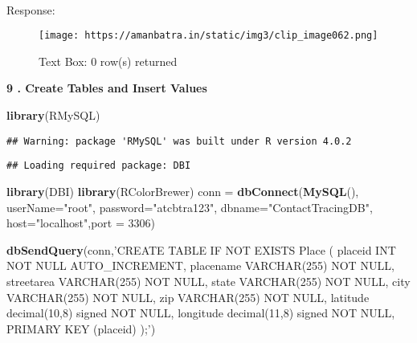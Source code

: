 \documentclass[
]{article}
\newenvironment{Shaded}{\begin{snugshade}}{\end{snugshade}}
\newcommand{\DataTypeTok}[1]{\textcolor[rgb]{0.13,0.29,0.53}{#1}}
\newcommand{\DecValTok}[1]{\textcolor[rgb]{0.00,0.00,0.81}{#1}}
\newcommand{\KeywordTok}[1]{\textcolor[rgb]{0.13,0.29,0.53}{\textbf{#1}}}
\newcommand{\NormalTok}[1]{#1}
\newcommand{\StringTok}[1]{\textcolor[rgb]{0.31,0.60,0.02}{#1}}
\begin{document}
~

Response:

\begin{figure}
\centering
\texttt{[image: https://amanbatra.in/static/img3/clip\_image062.png]}
\caption{Text Box: 0 row(s) returned}
\end{figure}

\textbf{9 . Create Tables and Insert Values}

\begin{Shaded}
\begin{Highlighting}[]
\KeywordTok{library}\NormalTok{(RMySQL)}
\end{Highlighting}
\end{Shaded}

\begin{verbatim}
## Warning: package 'RMySQL' was built under R version 4.0.2
\end{verbatim}

\begin{verbatim}
## Loading required package: DBI
\end{verbatim}

\begin{Shaded}
\begin{Highlighting}[]
\KeywordTok{library}\NormalTok{(DBI)}
\KeywordTok{library}\NormalTok{(RColorBrewer)}
\NormalTok{conn =}\StringTok{ }\KeywordTok{dbConnect}\NormalTok{(}\KeywordTok{MySQL}\NormalTok{(), }\DataTypeTok{userName=}\StringTok{"root"}\NormalTok{, }\DataTypeTok{password=}\StringTok{"atcbtra123"}\NormalTok{, }\DataTypeTok{dbname=}\StringTok{"ContactTracingDB"}\NormalTok{, }\DataTypeTok{host=}\StringTok{"localhost"}\NormalTok{,}\DataTypeTok{port =} \DecValTok{3306}\NormalTok{)}
\end{Highlighting}
\end{Shaded}

\begin{Shaded}
\begin{Highlighting}[]
\KeywordTok{dbSendQuery}\NormalTok{(conn,}\StringTok{'CREATE TABLE IF NOT EXISTS Place (}
\StringTok{  placeid INT NOT NULL AUTO_INCREMENT, }
\StringTok{  placename VARCHAR(255) NOT NULL, }
\StringTok{  streetarea VARCHAR(255) NOT NULL, }
\StringTok{  state VARCHAR(255) NOT NULL, }
\StringTok{  city VARCHAR(255) NOT NULL, }
\StringTok{  zip VARCHAR(255) NOT NULL,}
\StringTok{  latitude decimal(10,8) signed NOT NULL,}
\StringTok{  longitude decimal(11,8) signed NOT NULL,}
\StringTok{  PRIMARY KEY (placeid)}
\StringTok{);'}\NormalTok{)}
\end{Highlighting}
\end{Shaded}
\end{document}
